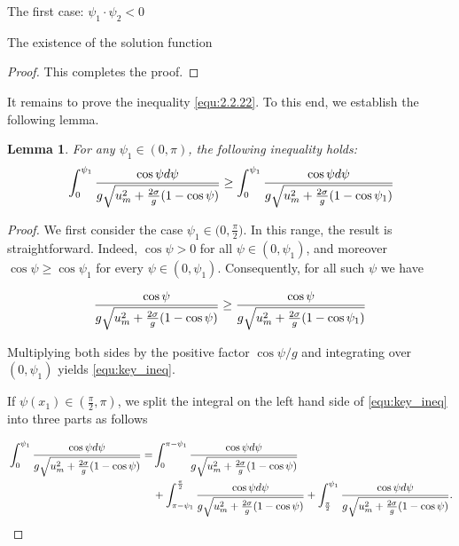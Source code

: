 \documentclass[letterpaper,reqno,10pt,twoside]{amsart}
\newtheorem{lemma}[theorem]{Lemma}
\theoremstyle{definition}
\theoremstyle{remark}
\begin{document}
\begin{section}{The first case: $\psi_1\cdot \psi_2<0$ }
\begin{subsection}{The existence of the solution function}
\begin{proof}
        \noindent This completes the proof.
    \end{proof}

     It remains to prove the inequality \eqref{equ:2.2.22}. To this end, we establish the following lemma.

    \begin{lemma}{\label{lem:1}}
    For any $\psi_{1}\in(0,\pi)$, the following inequality holds:
        \begin{equation}{\label{equ:key_ineq}}
        \int_{0}^{\psi_1}\frac{\cos\psi d\psi}{g\sqrt{u_{m}^{2}+\frac{2\sigma}{g}(1-\cos\psi)}}\geq \int_{0}^{\psi_1} \frac{\cos\psi d\psi}{g\sqrt{u_{m}^{2}+\frac{2\sigma}{g}(1-\cos\psi_{1})}}
        \end{equation}
    \end{lemma}

    \begin{proof}

    We first consider the case $\psi_{1}\in\bigl(0,\tfrac{\pi}{2}\bigr)$. In this range, the result is straightforward. Indeed, $\cos\psi>0$ for all $\psi\in(0,\psi_{1})$, and moreover $\cos\psi\ge\cos\psi_{1}$ for every $\psi\in(0,\psi_{1})$. Consequently, for all such $\psi$ we have

    \begin{equation}{\label{equ:2.2.24}}
        \frac{\cos\psi}{g\sqrt{u_{m}^{2}+\frac{2\sigma}{g}(1-\cos\psi)}}\geq \frac{\cos\psi}{g\sqrt{u_{m}^{2}+\frac{2\sigma}{g}(1-\cos\psi_1)}}
    \end{equation}

    \noindent Multiplying both sides by the positive factor $\cos\psi/g$ and integrating over $(0,\psi_{1})$ yields \eqref{equ:key_ineq}.
    
    If $\psi(x_1)\in (\frac{\pi}{2},\pi)$, we split the integral on the left hand side of \eqref{equ:key_ineq} into three parts as follows

    \begin{align}{\label{eq:integral_0}}
         \int_{0}^{\psi_1}\frac{\cos\psi d\psi}{g\sqrt{u_{m}^{2}+\frac{2\sigma}{g}(1-\cos\psi)}}=&\int_{0}^{\pi-\psi_1} \frac{\cos\psi d\psi}{g\sqrt{u_{m}^{2}+\frac{2\sigma}{g}(1-\cos\psi)}}\\
          &+\int_{\pi-\psi_1}^{\frac{\pi}{2}} \frac{\cos\psi d\psi}{g\sqrt{u_{m}^{2}+\frac{2\sigma}{g}(1-\cos\psi)}}+\int_{\frac{\pi}{2}}^{\psi_1} \frac{\cos\psi d\psi}{g\sqrt{u_{m}^{2}+\frac{2\sigma}{g}(1-\cos\psi)}}.
    \end{align}


\end{proof}
\end{subsection}
\end{section}
\end{document}
